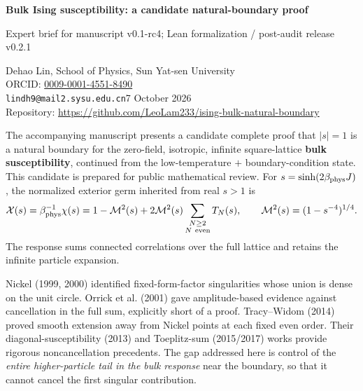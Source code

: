 \documentclass[11pt,a4paper]{article}
\newcommand{\heading}[1]{\par\vspace{5pt}{\large\bfseries #1}\par\vspace{1pt}}
\begin{document}
{\Large\bfseries Bulk Ising susceptibility: a candidate natural-boundary proof}\par
{\small Expert brief for manuscript v0.1-rc4; Lean formalization / post-audit release v0.2.1}\par
Dehao Lin, School of Physics, Sun Yat-sen University\\
{\small ORCID: \href{https://orcid.org/0009-0001-4551-8490}{0009-0001-4551-8490}}\\
\texttt{lindh9@mail2.sysu.edu.cn}\hfill 7 October 2026\\
{\small Repository: \url{https://github.com/LeoLam233/ising-bulk-natural-boundary}}

\heading{The object and the gap}
The accompanying manuscript presents a candidate complete proof that \(|s|=1\) is a
natural boundary for the zero-field, isotropic, infinite square-lattice
\textbf{bulk susceptibility}, continued from the low-temperature \( + \) boundary-condition state.
This candidate is prepared for public mathematical review.
For \(s=\sinh(2\beta_{\rm phys}J)\), the normalized exterior germ inherited
from real \(s>1\) is
\[
\mathcal X(s)=\beta_{\rm phys}^{-1}\chi(s)
=1-\mathcal M^2(s)+2\mathcal M^2(s)
 \sum_{\substack{N\ge2\\N\ {\rm even}}}T_N(s),
\qquad \mathcal M^2(s)=(1-s^{-4})^{1/4}.
\]
The response sums connected correlations over the full lattice and retains
the infinite particle expansion.

Nickel (1999, 2000) identified fixed-form-factor singularities whose union
is dense on the unit circle. Orrick et al. (2001) gave amplitude-based
evidence against cancellation in the full sum, explicitly short of a
proof. Tracy--Widom (2014) proved smooth extension
away from Nickel points at each fixed even order. Their diagonal-susceptibility
(2013) and Toeplitz-sum (2015/2017) works provide rigorous noncancellation
precedents. The gap addressed here is control of the
\emph{entire higher-particle tail in the bulk response} near the boundary,
so that it cannot cancel the first singular contribution.
\end{document}
